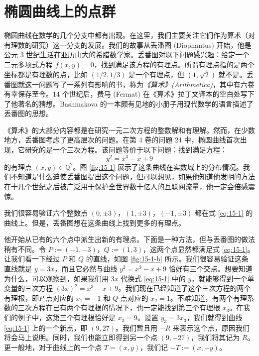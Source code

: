 \section{椭圆曲线上的点群}\label{sec:15-1}

椭圆曲线在数学的几个分支中都有出现。在这里，我们主要关注它们作为算术（对有理数的研究）这一分支的发展。我们的故事从丢潘图 (Diophantus) 开始，他是公元 3 世纪生活在亚历山大的希腊数学家。丢番图对以下问题感兴趣：给定一个二元多项式方程 $f(x,y)=0$，找到满足该方程的有理点。所谓有理点指的是两个坐标都是有理数的点，比如 $({1}/{2},{1}/{3})$ 是一个有理点，但 $(1,\sqrt{2})$ 就不是。丢番图就这一问题写了一系列有影响的书，称为\emph{《算术》(Arithmetica)}，其中有六卷有幸保存至今。14 个世纪后，费马 (Fermat) 在《算术》拉丁文译本的空白处写下了他著名的猜想。Bashmakova 的一本颇有见地的小册子用现代数学的语言描述了丢番图的思想。

《算术》的大部分内容都是在研究一元二次方程的整数解和有理解。然而，在少数地方，丢番图考虑了更高层次的问题。在第 4 卷的问题 24 中，椭圆曲线首次出现，它研究的是一个三次方程。该问题等价于以下问题：找到满足方程：
\begin{equation}\label{eq:15-1}
y^2=x^3-x+9
\end{equation}
的有理点 $(x,y)\in\mathbb{Q}^2$。图 \ref{fig:15-1} 展示了这条曲线在实数域上的分布情况。我们不知道是什么迫使丢番图提出这个问题，但可以想见，如果他知道他发明的方法在十几个世纪之后被广泛用于保护全世界数十亿人的互联网流量，他一定会倍感震惊。

我们很容易验证六个整数点 $(0,\pm3)$，$(1,\pm3)$，$(-1,\pm3)$ 都在式 \ref{eq:15-1} 的曲线上。但是，丢番图想在这条曲线上找到更多的有理点。

他开始从已有的六个点中派生出新的有理点。下面是一种方法，但与丢番图的做法稍有不同。令 $P:=(-1,-3)$，$Q:=(1,3)$，这两个点显然都满足式 \ref{eq:15-1}。让我们看一下经过 $P$ 和 $Q$ 的直线，如图 \ref{fig:15-1-b} 所示。我们很容易验证这条直线就是 $y=3x$，而且它必然与曲线 $y^2=x^3-x+9$ 恰好有三个交点。想要知道为什么，可以观察到，如果我们用 $3x$ 代换式 \ref{eq:15-1} 中的 $y$，就能够得到一个单变量的三次方程 $(3x)^2=x^3-x+9$。我们现在已经知道了这个三次方程的两个有理根，即$P$ 点对应的 $x_1=-1$ 和 $Q$ 点对应的 $x_2=1$。不难知道，有两个有理系数的三次方程在已有两个有理根的情况下，也一定能找到第三个有理根 $x_3$。在我们的例子中，这第三个有理根恰好是 $x_3=9$。设置 $y_3=3x_3$，我们就得到曲线 \ref{eq:15-1} 上的一个新点，即 $(9,27)$。我们暂且用 $-R$ 来表示这个点，原因我们将会马上说明。同时，我们也能立即得到另一个点 $(9,-27)$，我们将其记为 $R$。更一般地，对于曲线上的一个点 $T=(x,y)$，我们记 $-T:=(x,-y)$。

